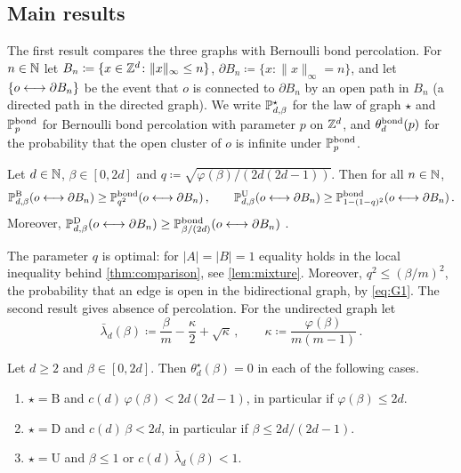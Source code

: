 \documentclass[11pt,letterpaper]{article}
\begin{document}
\subsection{Main results}

The first result compares the three graphs with Bernoulli bond percolation. For $n\in\N$ let $B_n\coloneqq\{x\in\Z^d\colon\|x\|_\infty\le n\}$, $\partial B_n\coloneqq\{x\colon\|x\|_\infty=n\}$, and let $\{o\lra\partial B_n\}$ be the event that $o$ is connected to $\partial B_n$ by an open path in $B_n$ (a directed path in the directed graph). We write $\P^{\star}_{d,\beta}$ for the law of graph $\star$ and $\P^{\bond}_p$ for Bernoulli bond percolation with parameter $p$ on $\Z^d$, and $\theta^{\bond}_d(p)$ for the probability that the open cluster of $o$ is infinite under $\P^{\bond}_p$.

\begin{theorem}\label{thm:comparison}
Let $d\in\N$, $\beta\in[0,2d]$ and $q\coloneqq\sqrt{\varphi(\beta)/(2d(2d-1))}$. Then for all $n\in\N$,
\begin{equation*}
\P^{\mathrm B}_{d,\beta}(o\lra\partial B_n)\ge\P^{\bond}_{q^2}(o\lra\partial B_n)\,,\qquad\P^{\mathrm U}_{d,\beta}(o\lra\partial B_n)\ge\P^{\bond}_{1-(1-q)^2}(o\lra\partial B_n)\,.
\end{equation*}
Moreover, $\P^{\mathrm D}_{d,\beta}(o\lra\partial B_n)\ge\P^{\bond}_{\beta/(2d)}(o\lra\partial B_n)$ \cite[Corollary~3.3, Theorem~2.1 and Lemma~3.5]{BJKLRT25}.
\end{theorem}

The parameter $q$ is optimal: for $|A|=|B|=1$ equality holds in the local inequality behind \cref{thm:comparison}, see \cref{lem:mixture}. Moreover, $q^2\le(\beta/m)^2$, the probability that an edge is open in the bidirectional graph, by \eqref{eq:G1}. The second result gives absence of percolation. For the undirected graph let
\begin{equation*}
\bar\lambda_d(\beta)\coloneqq\frac\beta m-\frac \kappa2+\sqrt \kappa\,,\qquad \kappa\coloneqq\frac{\varphi(\beta)}{m(m-1)}\,.
\end{equation*}

\begin{theorem}\label{thm:absence}
Let $d\ge2$ and $\beta\in[0,2d]$. Then $\theta^{\star}_d(\beta)=0$ in each of the following cases.
\begin{enumerate}
\item[(B)] $\star=\mathrm B$ and $c(d)\,\varphi(\beta)<2d(2d-1)$, in particular if $\varphi(\beta)\le2d$.
\item[(D)] $\star=\mathrm D$ and $c(d)\,\beta<2d$, in particular if $\beta\le2d/(2d-1)$.
\item[(U)] $\star=\mathrm U$ and $\beta\le1$ or $c(d)\,\bar\lambda_d(\beta)<1$.
\end{enumerate}
\end{theorem}
\end{document}
